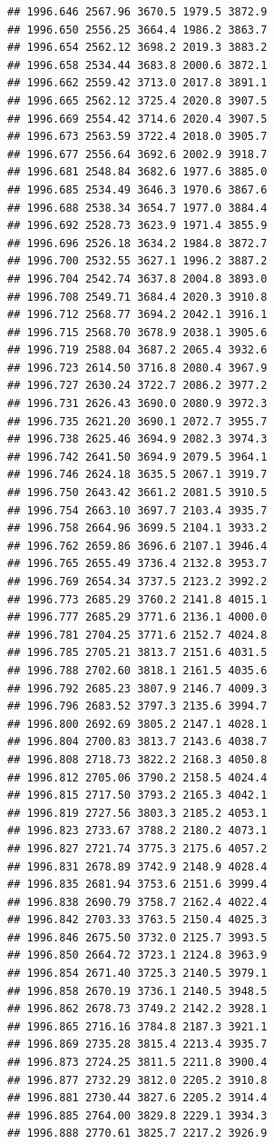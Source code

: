\documentclass[
]{book}
\begin{document}
\begin{verbatim}
## 1996.646 2567.96 3670.5 1979.5 3872.9
## 1996.650 2556.25 3664.4 1986.2 3863.7
## 1996.654 2562.12 3698.2 2019.3 3883.2
## 1996.658 2534.44 3683.8 2000.6 3872.1
## 1996.662 2559.42 3713.0 2017.8 3891.1
## 1996.665 2562.12 3725.4 2020.8 3907.5
## 1996.669 2554.42 3714.6 2020.4 3907.5
## 1996.673 2563.59 3722.4 2018.0 3905.7
## 1996.677 2556.64 3692.6 2002.9 3918.7
## 1996.681 2548.84 3682.6 1977.6 3885.0
## 1996.685 2534.49 3646.3 1970.6 3867.6
## 1996.688 2538.34 3654.7 1977.0 3884.4
## 1996.692 2528.73 3623.9 1971.4 3855.9
## 1996.696 2526.18 3634.2 1984.8 3872.7
## 1996.700 2532.55 3627.1 1996.2 3887.2
## 1996.704 2542.74 3637.8 2004.8 3893.0
## 1996.708 2549.71 3684.4 2020.3 3910.8
## 1996.712 2568.77 3694.2 2042.1 3916.1
## 1996.715 2568.70 3678.9 2038.1 3905.6
## 1996.719 2588.04 3687.2 2065.4 3932.6
## 1996.723 2614.50 3716.8 2080.4 3967.9
## 1996.727 2630.24 3722.7 2086.2 3977.2
## 1996.731 2626.43 3690.0 2080.9 3972.3
## 1996.735 2621.20 3690.1 2072.7 3955.7
## 1996.738 2625.46 3694.9 2082.3 3974.3
## 1996.742 2641.50 3694.9 2079.5 3964.1
## 1996.746 2624.18 3635.5 2067.1 3919.7
## 1996.750 2643.42 3661.2 2081.5 3910.5
## 1996.754 2663.10 3697.7 2103.4 3935.7
## 1996.758 2664.96 3699.5 2104.1 3933.2
## 1996.762 2659.86 3696.6 2107.1 3946.4
## 1996.765 2655.49 3736.4 2132.8 3953.7
## 1996.769 2654.34 3737.5 2123.2 3992.2
## 1996.773 2685.29 3760.2 2141.8 4015.1
## 1996.777 2685.29 3771.6 2136.1 4000.0
## 1996.781 2704.25 3771.6 2152.7 4024.8
## 1996.785 2705.21 3813.7 2151.6 4031.5
## 1996.788 2702.60 3818.1 2161.5 4035.6
## 1996.792 2685.23 3807.9 2146.7 4009.3
## 1996.796 2683.52 3797.3 2135.6 3994.7
## 1996.800 2692.69 3805.2 2147.1 4028.1
## 1996.804 2700.83 3813.7 2143.6 4038.7
## 1996.808 2718.73 3822.2 2168.3 4050.8
## 1996.812 2705.06 3790.2 2158.5 4024.4
## 1996.815 2717.50 3793.2 2165.3 4042.1
## 1996.819 2727.56 3803.3 2185.2 4053.1
## 1996.823 2733.67 3788.2 2180.2 4073.1
## 1996.827 2721.74 3775.3 2175.6 4057.2
## 1996.831 2678.89 3742.9 2148.9 4028.4
## 1996.835 2681.94 3753.6 2151.6 3999.4
## 1996.838 2690.79 3758.7 2162.4 4022.4
## 1996.842 2703.33 3763.5 2150.4 4025.3
## 1996.846 2675.50 3732.0 2125.7 3993.5
## 1996.850 2664.72 3723.1 2124.8 3963.9
## 1996.854 2671.40 3725.3 2140.5 3979.1
## 1996.858 2670.19 3736.1 2140.5 3948.5
## 1996.862 2678.73 3749.2 2142.2 3928.1
## 1996.865 2716.16 3784.8 2187.3 3921.1
## 1996.869 2735.28 3815.4 2213.4 3935.7
## 1996.873 2724.25 3811.5 2211.8 3900.4
## 1996.877 2732.29 3812.0 2205.2 3910.8
## 1996.881 2730.44 3827.6 2205.2 3914.4
## 1996.885 2764.00 3829.8 2229.1 3934.3
## 1996.888 2770.61 3825.7 2217.2 3926.9

\end{verbatim}
\end{document}
